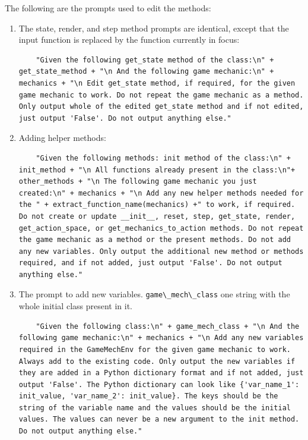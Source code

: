 \documentclass{article} %
\begin{document}
The following are the prompts used to edit the methods:

\begin{enumerate}
    

\item The state, render, and step method prompts are identical, except that the input function is replaced by the function currently in focus:


\begin{lstlisting}
    "Given the following get_state method of the class:\n" + get_state_method + "\n And the following game mechanic:\n" + mechanics + "\n Edit get_state method, if required, for the given game mechanic to work. Do not repeat the game mechanic as a method. Only output whole of the edited get_state method and if not edited, just output 'False'. Do not output anything else."
\end{lstlisting}

\item Adding helper methods:


\begin{lstlisting}
    "Given the following methods: init method of the class:\n" + init_method + "\n All functions already present in the class:\n"+ other_methods + "\n The following game mechanic you just created:\n" + mechanics + "\n Add any new helper methods needed for the " + extract_function_name(mechanics) +" to work, if required. Do not create or update __init__, reset, step, get_state, render, get_action_space, or get_mechanics_to_action methods. Do not repeat the game mechanic as a method or the present methods. Do not add any new variables. Only output the additional new method or methods required, and if not added, just output 'False'. Do not output anything else."
\end{lstlisting}

\item The prompt to add new variables. \lstinline|game\_mech\_class| one string with the whole initial class present in it.

\begin{lstlisting}
    "Given the following class:\n" + game_mech_class + "\n And the following game mechanic:\n" + mechanics + "\n Add any new variables required in the GameMechEnv for the given game mechanic to work. Always add to the existing code. Only output the new variables if they are added in a Python dictionary format and if not added, just output 'False'. The Python dictionary can look like {'var_name_1': init_value, 'var_name_2': init_value}. The keys should be the string of the variable name and the values should be the initial values. The values can never be a new argument to the init method. Do not output anything else."
\end{lstlisting}


\end{enumerate}
\end{document}
